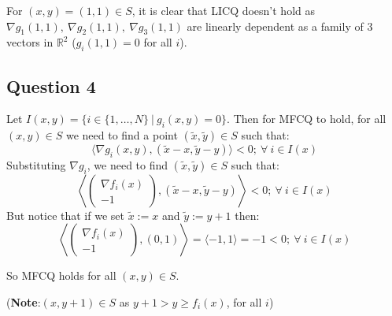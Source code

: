 \documentclass[12p]{article}
\begin{document}
For \((x,y)=(1,1)\in S\), it is clear that LICQ doesn't hold as \(\nabla g_1(1,1),\ \nabla g_2(1,1),\ \nabla g_3(1,1)\) are linearly dependent as a family of 3 vectors in \(\mathbb{R}^2\) (\(g_i(1,1)=0\) for all \(i\)).

\subsection*{Question 4}\hfil\par
Let \(I(x,y)=\{i\in\{1,\dots ,N\}\ |\ g_i(x,y)=0\}\). Then for MFCQ to hold, for all \((x,y)\in S\) we need to find a point \((\tilde x, \tilde y)\in S\) such that:
\[
  \langle \nabla g_i(x,  y), (\tilde x- x, \tilde y-y)\rangle<0;\ \forall\ i\in I(x)
\]
Substituting \(\nabla g_i\), we need to find \((\tilde x, \tilde y)\in S\) such that:
\[
    \left\langle \begin{pmatrix}
        \nabla f_i(x)\\
         -1
        \end{pmatrix}    , (\tilde x- x, \tilde y-y)\right\rangle<0;\ \forall\ i\in I(x)
\]
But notice that if we set \(\tilde x:=x\) and \(\tilde y:=y+1\) then:
\[
    \left\langle \begin{pmatrix}
        \nabla f_i(x)\\
         -1
        \end{pmatrix}    , (0, 1)\right\rangle=\langle-1,1\rangle=-1<0;\ \forall\ i\in I(x)
\]

So MFCQ holds for all \((x,y)\in S\).

(\textbf{Note}:\((x,y+1)\in S\) as \(y+1>y\geq f_i(x)\), for all \(i\))
\end{document}
